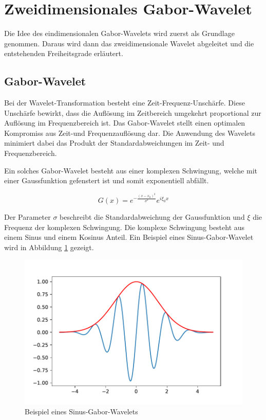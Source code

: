 \section{Zweidimensionales Gabor-Wavelet}

Die Idee des eindimensionalen Gabor-Wavelets wird zuerst als Grundlage genommen. 
Daraus wird dann das zweidimensionale Wavelet abgeleitet und die entstehenden Freiheitsgrade erläutert.

\subsection{Gabor-Wavelet}

Bei der Wavelet-Transformation besteht eine Zeit-Frequenz-Unschärfe.
Diese Unschärfe bewirkt, dass die Auflösung im Zeitbereich umgekehrt proportional zur Auflösung im Frequenzbereich ist.
Das Gabor-Wavelet stellt einen optimalen Kompromiss aus Zeit-und Frequenzauflösung dar.
Die Anwendung des Wavelets minimiert dabei das Produkt der Standardabweichungen im Zeit- und Frequenzbereich. \cite{paper:communication}

Ein solches Gabor-Wavelet besteht aus einer komplexen Schwingung, welche mit einer Gaussfunktion gefenstert ist und somit exponentiell abfällt.

\begin{equation}
G(x)= e^{-\frac{(x-x_{0})^{2}}{\sigma^{2}}} e^{i\xi_{0}x}
\end{equation}

Der Parameter $\sigma$ beschreibt die Standardabweichung der Gaussfunktion und $\xi$ die Frequenz der komplexen Schwingung. 
Die komplexe Schwingung besteht aus einem Sinus und einem  Kosinus Anteil. 
Ein Beispiel eines Sinus-Gabor-Wavelet wird in Abbildung \ref{fig:gabor1d} gezeigt.

\begin{figure}
	\centering
	\includegraphics[width=0.7\linewidth]{./papers/visuell/images/gabor_1d}
	\caption{Beispiel eines Sinus-Gabor-Wavelets}
	\label{fig:gabor1d}
\end{figure}



